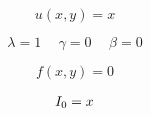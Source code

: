 \documentclass[12pt,a4paper]{article}
\newcommand{\romannumeralcaps}[1]{\MakeUppercase{\romannumeral #1}}
\begin{document}
    \thispagestyle{empty}

    \Large

    \[ u(x,y) = x \]

    \[
    \lambda = 1 \hspace{15pt}
    \gamma  = 0 \hspace{15pt}
    \beta   = 0
    \]

    \[ f(x,y) = 0 \]

    \begin{eqnarray*}
        \romannumeralcaps{1}_0 = x
    \end{eqnarray*}
\end{document}
